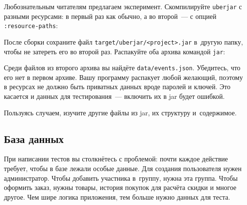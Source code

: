 Любознательным читателям предлагаем эксперимент. Скомпилируйте \verb|uberjar|
с разными ресурсами: в первый раз как обычно, а во второй~--- с опцией
\verb|:resource-paths|:

\ifx\DEVICETYPE\MOBILE

\begin{english}
  \begin{clojure}
:profiles
  {:uberjar {:resource-paths
             ["env/test/resources"]}
  \end{clojure}
\end{english}

\else

\begin{english}
  \begin{clojure}
:profiles {:uberjar {:resource-paths ["env/test/resources"]}
  \end{clojure}
\end{english}

\fi

После сборки сохраните файл \texttt{target/uber\-jar/<project>.jar} в~другую папку,
чтобы не затереть его во второй раз. Распакуйте оба архива командой \verb|jar|:

\begin{english}
\end{english}

Среди файлов из второго архива вы найдёте \verb|data/events.json|. Убедитесь,
что его нет в первом архиве. Вашу программу распакует любой желающий, поэтому в
ресурсах не должно быть приватных данных вроде паролей и ключей. Это касается и
данных для тестирования~--- включить их в jar будет ошибкой.

Пользуясь случаем, изучите другие файлы из jar, их структуру и~содержимое.

\subsection{База данных}


При написании тестов вы столкнётесь с проблемой: почти каждое действие требует,
чтобы в базе лежали особые данные. Для создания пользователя нужен
администратор. Чтобы добавить участника в~группу, нужна эта группа. Чтобы
оформить заказ, нужны товары, история покупок для расчёта скидки и многое
другое. Чем шире логика приложения, тем больше нужно данных для теста.

